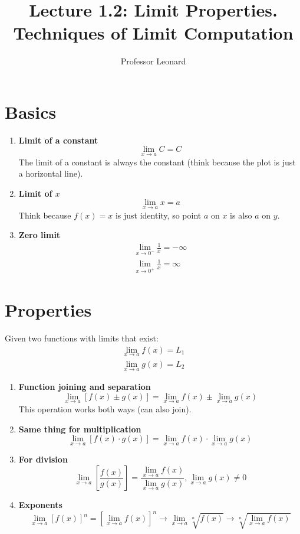 \documentclass{article}
\begin{document}
\title{Lecture 1.2: Limit Properties. Techniques of Limit Computation}
\author{Professor Leonard}
\maketitle

\section{Basics}

\begin{enumerate}
    \item \textbf{Limit of a constant}
$$
\lim_{x \to a} C = C
$$
The limit of a constant is always the constant (think because the plot is just a
horizontal line).

    \item \textbf{Limit of $x$}
        $$
        \lim_{x\to a} x = a
        $$
        Think because $f(x) = x$ is just identity, so point $a$ on $x$ is also $a$ on $y$.

    \item \textbf{Zero limit}
        \begin{align*}
            \lim_{x\to 0^-} \frac{1}{x}= -\infty\\
            \lim_{x\to 0^+} \frac{1}{x} = \infty
        \end{align*}

\end{enumerate}

\section{Properties}

Given two functions with limits that exist:
\begin{align*}
    \lim_{x\to a}f(x) = L_1\\
    \lim_{x\to a} g(x) = L_2
\end{align*}

\begin{enumerate}
    \item \textbf{Function joining and separation}
        $$
        \lim_{x\to a} [f(x) \pm g(x)] = \lim_{x\to a}f(x) \pm \lim_{x\to a}g(x)
        $$
        This operation works both ways (can also join).

    \item \textbf{Same thing for multiplication}
        $$
        \lim_{x\to a} [f(x) \cdot g(x)] = \lim_{x\to a}f(x) \cdot \lim_{x\to a}g(x)
        $$
    \item \textbf{For division}
        $$
        \lim_{x\to a} \left[ \frac{f(x)}{g(x)} \right] = \frac{\lim_{x\to
        a}f(x)}{\lim_{x\to a}g(x)}, \lim_{x\to a}g(x) \neq 0
        $$

    \item \textbf{Exponents}
        $$
        \lim_{x\to a}[f(x)]^n = \left[\lim_{x\to a} f(x) \right]^n \rightarrow \lim_{x\to
        a} \sqrt[n]{f(x)} \rightarrow \sqrt[n]{\lim_{x\to a}f(x)}
        $$

\end{enumerate}
\end{document}
